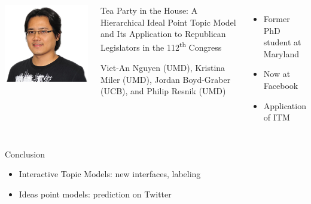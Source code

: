 \documentclass[compress]{beamer}
\begin{document}



\begin{frame}{}

  \begin{columns}
      \includegraphics[width=.9\linewidth]{general_figures/an}
    \begin{block}{Tea Party in the House: A Hierarchical Ideal Point Topic Model
  and Its Application to Republican Legislators in the 112\textsuperscript{th} Congress}
  
  Viet-An Nguyen (UMD), Kristina Miler (UMD), Jordan Boyd-Graber (UCB), and Philip Resnik (UMD)
  
    \end{block}
      \begin{itemize}
        \item Former PhD student at Maryland
        \item Now at Facebook
        \item Application of ITM
      \end{itemize}
  \end{columns}

\end{frame}




\begin{frame}{Conclusion}


      \begin{itemize}
        \item Interactive Topic Models: new interfaces, labeling
        \item Ideas point models: prediction on Twitter 
      \end{itemize}


\end{frame}
\end{document}
